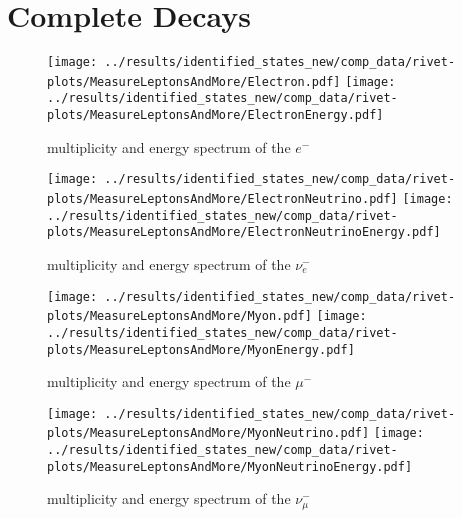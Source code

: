 \section{Complete Decays} \label{a:complete}
\begin{figure}[h]
  \centering
  \texttt{[image: ../results/identified\_states\_new/comp\_data/rivet-plots/MeasureLeptonsAndMore/Electron.pdf]}
  \texttt{[image: ../results/identified\_states\_new/comp\_data/rivet-plots/MeasureLeptonsAndMore/ElectronEnergy.pdf]}
  \caption{multiplicity and energy spectrum of the \(e^-\)}
\end{figure}
\begin{figure}[h]
  \centering
  \texttt{[image: ../results/identified\_states\_new/comp\_data/rivet-plots/MeasureLeptonsAndMore/ElectronNeutrino.pdf]}
  \texttt{[image: ../results/identified\_states\_new/comp\_data/rivet-plots/MeasureLeptonsAndMore/ElectronNeutrinoEnergy.pdf]}
  \caption{multiplicity and energy spectrum of the \(\nu_e^-\)}
\end{figure}
\begin{figure}[h]
  \centering
  \texttt{[image: ../results/identified\_states\_new/comp\_data/rivet-plots/MeasureLeptonsAndMore/Myon.pdf]}
  \texttt{[image: ../results/identified\_states\_new/comp\_data/rivet-plots/MeasureLeptonsAndMore/MyonEnergy.pdf]}
  \caption{multiplicity and energy spectrum of the \(\mu^-\)}
\end{figure}
\begin{figure}[h]
  \centering
  \texttt{[image: ../results/identified\_states\_new/comp\_data/rivet-plots/MeasureLeptonsAndMore/MyonNeutrino.pdf]}
  \texttt{[image: ../results/identified\_states\_new/comp\_data/rivet-plots/MeasureLeptonsAndMore/MyonNeutrinoEnergy.pdf]}
  \caption{multiplicity and energy spectrum of the \(\nu_\mu^-\)}
\end{figure}

